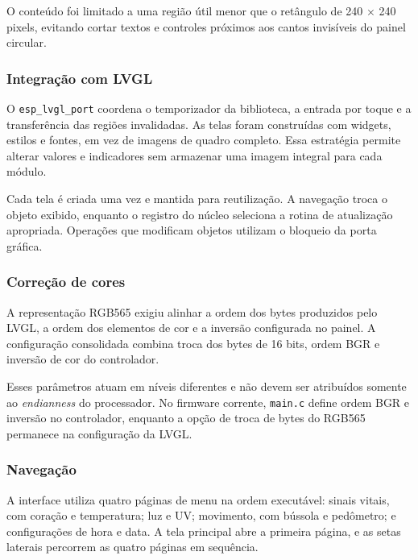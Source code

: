 \documentclass[a4paper,12pt]{article}
\begin{document}
O conte\'udo foi limitado a uma regi\~ao \'util menor que o ret\^angulo de 240 $\times$ 240 pixels, evitando cortar textos e controles pr\'oximos aos cantos invis\'iveis do painel circular.


\subsubsection{Integra\c{c}\~ao com LVGL}


O \texttt{esp\_lvgl\_port} coordena o temporizador da biblioteca, a entrada por toque e a transfer\^encia das regi\~oes invalidadas. As telas foram constru\'idas com widgets, estilos e fontes, em vez de imagens de quadro completo. Essa estrat\'egia permite alterar valores e indicadores sem armazenar uma imagem integral para cada m\'odulo.


Cada tela \'e criada uma vez e mantida para reutiliza\c{c}\~ao. A navega\c{c}\~ao troca o objeto exibido, enquanto o registro do n\'ucleo seleciona a rotina de atualiza\c{c}\~ao apropriada. Opera\c{c}\~oes que modificam objetos utilizam o bloqueio da porta gr\'afica.


\subsubsection{Corre\c{c}\~ao de cores}


A representa\c{c}\~ao RGB565 exigiu alinhar a ordem dos bytes produzidos pelo LVGL, a ordem dos elementos de cor e a invers\~ao configurada no painel. A configura\c{c}\~ao consolidada combina troca dos bytes de 16 bits, ordem BGR e invers\~ao de cor do controlador.


Esses par\^ametros atuam em n\'iveis diferentes e n\~ao devem ser atribu\'idos somente ao \emph{endianness} do processador. No firmware corrente, \texttt{main.c} define ordem BGR e invers\~ao no controlador, enquanto a op\c{c}\~ao de troca de bytes do RGB565 permanece na configura\c{c}\~ao da LVGL.


\subsubsection{Navega\c{c}\~ao}


A interface utiliza quatro p\'aginas de menu na ordem execut\'avel: sinais vitais, com cora\c{c}\~ao e temperatura; luz e UV; movimento, com b\'ussola e ped\^ometro; e configura\c{c}\~oes de hora e data. A tela principal abre a primeira p\'agina, e as setas laterais percorrem as quatro p\'aginas em sequ\^encia.
\end{document}
